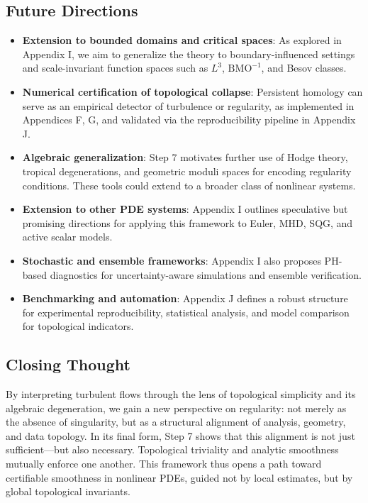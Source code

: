 \documentclass[11pt]{article}
\theoremstyle{definition}
\begin{document}
\subsection*{Future Directions}

\begin{itemize}
    \item \textbf{Extension to bounded domains and critical spaces}: As explored in Appendix I, we aim to generalize the theory to boundary-influenced settings and scale-invariant function spaces such as $L^3$, $\mathrm{BMO}^{-1}$, and Besov classes.
    \item \textbf{Numerical certification of topological collapse}: Persistent homology can serve as an empirical detector of turbulence or regularity, as implemented in Appendices F, G, and validated via the reproducibility pipeline in Appendix J.
    \item \textbf{Algebraic generalization}: Step 7 motivates further use of Hodge theory, tropical degenerations, and geometric moduli spaces for encoding regularity conditions. These tools could extend to a broader class of nonlinear systems.
    \item \textbf{Extension to other PDE systems}: Appendix I outlines speculative but promising directions for applying this framework to Euler, MHD, SQG, and active scalar models.
    \item \textbf{Stochastic and ensemble frameworks}: Appendix I also proposes PH-based diagnostics for uncertainty-aware simulations and ensemble verification.
    \item \textbf{Benchmarking and automation}: Appendix J defines a robust structure for experimental reproducibility, statistical analysis, and model comparison for topological indicators.
\end{itemize}

\subsection*{Closing Thought}

By interpreting turbulent flows through the lens of topological simplicity and its algebraic degeneration, we gain a new perspective on regularity: not merely as the absence of singularity, but as a structural alignment of analysis, geometry, and data topology. In its final form, Step 7 shows that this alignment is not just sufficient—but also necessary. Topological triviality and analytic smoothness mutually enforce one another. This framework thus opens a path toward certifiable smoothness in nonlinear PDEs, guided not by local estimates, but by global topological invariants.
\end{document}
